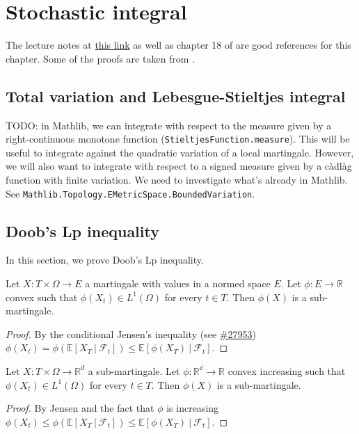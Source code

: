 \chapter{Stochastic integral}

The lecture notes at \href{https://dec41.user.srcf.net/h/III_L/stochastic_calculus_and_applications/}{this link} as well as chapter 18 of \cite{kallenberg2021} are good references for this chapter.
Some of the proofs are taken from \cite{pascucci2024}.

\section{Total variation and Lebesgue-Stieltjes integral}

TODO: in Mathlib, we can integrate with respect to the measure given by a right-continuous monotone function (\texttt{StieltjesFunction.measure}). This will be useful to integrate against the quadratic variation of a local martingale.
However, we will also want to integrate with respect to a signed measure given by a càdlàg function with finite variation.
We need to investigate what's already in Mathlib. See \texttt{Mathlib.Topology.EMetricSpace.BoundedVariation}.


\section{Doob's Lp inequality}

In this section, we prove Doob's Lp inequality.

\begin{lemma}\label{lem:convex_of_mg_is_submg}
  Let $X:T\times\Omega\rightarrow E$ a martingale with values in a normed space $E$.
  Let $\phi : E \rightarrow \mathbb{R}$ convex such that
  $\phi(X_t)\in L^1(\Omega)$ for every $t\in T$. Then $\phi(X)$ is a sub-martingale.
\end{lemma}
\begin{proof}
  By the conditional Jensen's inequality (see \href{https://github.com/leanprover-community/mathlib4/pull/27953}{\#27953})
  $\phi(X_t) = \phi\left( \mathbb{E}[X_T\ |\ \mathcal{F}_t] \right)\leq \mathbb{E}[\phi(X_T)\ |\ \mathcal{F}_t]$.
\end{proof}

\begin{lemma}\label{lem:convex_of_submg_is_submg}
  Let $X:T\times\Omega\rightarrow \mathbb{R}^d$ a sub-martingale.
  Let $\phi:\mathbb{R^d}\rightarrow \mathbb{R}$ convex increasing such that
  $\phi(X_t)\in L^1(\Omega)$ for every $t\in T$. Then $\phi(X)$ is a sub-martingale.
\end{lemma}
\begin{proof}
  By Jensen and the fact that $\phi$ is increasing
  $\phi(X_t) \leq \phi\left( \mathbb{E}[X_T\ |\ \mathcal{F}_t] \right)\leq \mathbb{E}[\phi(X_T)\ |\ \mathcal{F}_t]$.
\end{proof}

